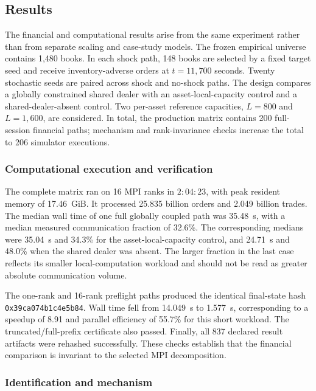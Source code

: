 \subsection{Results}
\label{sec:final_case_results}

The financial and computational results arise from the same experiment rather
than from separate scaling and case-study models.  The frozen empirical
universe contains 1,480 books.  In each shock path, 148 books are selected by a
fixed target seed and receive inventory-adverse orders at $t=11{,}700$ seconds.
Twenty stochastic seeds are paired across shock and no-shock paths.  The design
compares a globally constrained shared dealer with an asset-local-capacity
control and a shared-dealer-absent control.  Two per-asset reference capacities,
$L=800$ and $L=1{,}600$, are considered.  In total, the production matrix
contains 200 full-session financial paths; mechanism and rank-invariance checks
increase the total to 206 simulator executions.

\subsubsection{Computational execution and verification}

The complete matrix ran on 16 MPI ranks in \(2{:}04{:}23\), with peak resident
memory of 17.46~GiB.  It processed 25.835 billion orders and 2.049 billion
trades.  The median wall time of one full globally coupled path was 35.48~s,
with a median measured communication fraction of 32.6\%.  The corresponding
medians were 35.04~s and 34.3\% for the asset-local-capacity control, and
24.71~s and 48.0\% when the shared dealer was absent.  The larger fraction in
the last case reflects its smaller local-computation workload and should not be
read as greater absolute communication volume.

The one-rank and 16-rank preflight paths produced the identical final-state
hash \texttt{0x39ca074b1c4e5b84}.  Wall time fell from 14.049~s to 1.577~s,
corresponding to a speedup of 8.91 and parallel efficiency of 55.7\% for this
short workload.  The truncated/full-prefix certificate also passed.  Finally,
all 837 declared result artifacts were rehashed successfully.  These checks
establish that the financial comparison is invariant to the selected MPI
decomposition.

\subsubsection{Identification and mechanism}

